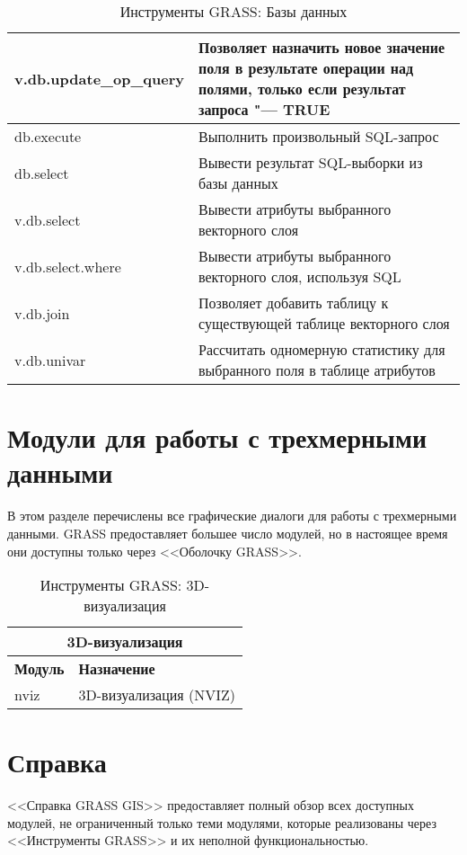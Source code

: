 {\begin{table}[H]
\begin{tabular}{|p{4cm}|p{10cm}|}
  \hline v.db.update\_op\_query & Позволяет назначить новое значение поля в
  результате операции над полями, только если результат запроса "--- TRUE \\
  \hline db.execute & Выполнить произвольный SQL-запрос \\
  \hline db.select & Вывести результат SQL-выборки из базы данных \\
  \hline v.db.select & Вывести атрибуты выбранного векторного слоя \\
  \hline v.db.select.where & Вывести атрибуты выбранного векторного
  слоя, используя SQL \\
  \hline v.db.join & Позволяет добавить таблицу к существующей таблице
  векторного слоя \\
  \hline v.db.univar & Рассчитать одномерную статистику для выбранного
  поля в таблице атрибутов \\
\hline
\end{tabular}
\caption{Инструменты GRASS: Базы данных}
\end{table}}

\clearpage

\section{Модули для работы с трехмерными данными}

В этом разделе перечислены все графические диалоги для работы с
трехмерными данными. GRASS предоставляет большее число модулей, но в
настоящее время они доступны только через <<Оболочку GRASS>>.

{\renewcommand{\arraystretch}{0.7}
\begin{table}[H]
\centering
 \begin{tabular}{|p{4cm}|p{10cm}|}
  \hline \multicolumn{2}{|c|}{\textbf{3D-визуализация}} \\
  \hline \textbf{Модуль} & \textbf{Назначение} \\
  \hline nviz & 3D-визуализация (NVIZ) \\
\hline
\end{tabular}
\caption{Инструменты GRASS: 3D-визуализация}
\end{table}}

\section{Справка}

<<Справка GRASS GIS>> предоставляет полный обзор всех доступных модулей,
не ограниченный только теми модулями, которые реализованы через
<<Инструменты GRASS>> и их неполной функциональностью.

